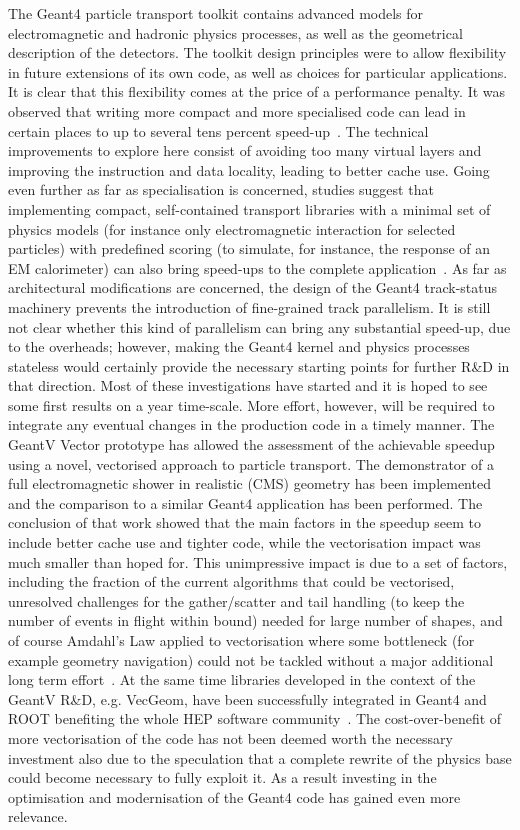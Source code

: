 \documentclass[11pt,a4paper]{article}
\begin{document}
The Geant4 particle transport toolkit contains advanced models for
electromagnetic and hadronic physics processes, as well as the
geometrical description of the detectors. The toolkit design principles
were to allow flexibility in future extensions of its own code, as well
as choices for particular applications. It is clear that this
flexibility comes at the price of a performance penalty. It was observed that
writing more compact and more specialised code can lead in certain
places to up to several tens percent speed-up~\cite{GeantV}. The
technical improvements to explore here consist of avoiding too many
virtual layers and improving the instruction and data locality, leading
to better cache use. Going even further as far as specialisation is
concerned, studies suggest that implementing compact, self-contained
transport libraries with a minimal set of physics models (for instance
only electromagnetic interaction for selected particles) with predefined
scoring (to simulate, for instance, the response of an EM calorimeter)
can also bring speed-ups to the complete application~\cite{GeantV}. As
far as architectural modifications are concerned, the design of the
Geant4 track-status machinery prevents the introduction of fine-grained
track parallelism. It is still not clear whether this kind of
parallelism can bring any substantial speed-up, due to the overheads;
however, making the Geant4 kernel and physics processes stateless would
certainly provide the necessary starting points for further R\&D in that
direction. Most of these investigations have started and it is hoped to
see some first results on a year time-scale. More effort, however, will
be required to integrate any eventual changes in the production code in
a timely manner. The GeantV Vector prototype has allowed the assessment
of the achievable speedup using a novel, vectorised approach to particle
transport. The demonstrator of a full electromagnetic shower in
realistic (CMS) geometry has been implemented and the comparison to a
similar Geant4 application has been performed. The conclusion of that
work showed that the main factors in the speedup seem to include better
cache use and tighter code, while the vectorisation impact was much
smaller than hoped for. This unimpressive impact is due to a set of
factors, including the fraction of the current algorithms that could be
vectorised, unresolved challenges for the gather/scatter and tail
handling (to keep the number of events in flight within bound) needed
for large number of shapes, and of course Amdahl's Law applied to
vectorisation where some bottleneck (for example geometry navigation)
could not be tackled without a major additional long term effort~\cite{GeantV}.
At the same time libraries developed in the context of the
GeantV R\&D, e.g. VecGeom, have been successfully integrated in Geant4
and ROOT benefiting the whole HEP software community~\cite{CMS01}. The
cost-over-benefit of more vectorisation of the code has not been deemed
worth the necessary investment also due to the speculation that a
complete rewrite of the physics base could become necessary to fully
exploit it. As a result investing in the optimisation and modernisation
of the Geant4 code has gained even more relevance.
\end{document}
